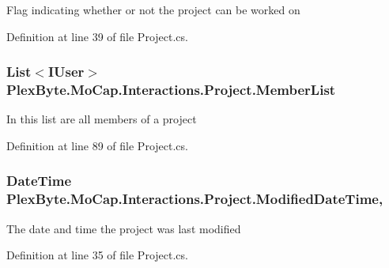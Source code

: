 Flag indicating whether or not the project can be worked on 



Definition at line 39 of file Project.\+cs.

\subsubsection[{\texorpdfstring{Member\+List}{MemberList}}]{\setlength{\rightskip}{0pt plus 5cm}List$<$I\+User$>$ Plex\+Byte.\+Mo\+Cap.\+Interactions.\+Project.\+Member\+List\hspace{0.3cm}{\ttfamily [get]}}\hypertarget{class_plex_byte_1_1_mo_cap_1_1_interactions_1_1_project_a2b3c3d78367b1ca4f4a4ae87e3b444ab}{}\label{class_plex_byte_1_1_mo_cap_1_1_interactions_1_1_project_a2b3c3d78367b1ca4f4a4ae87e3b444ab}


In this list are all members of a project 



Definition at line 89 of file Project.\+cs.

\subsubsection[{\texorpdfstring{Modified\+Date\+Time}{ModifiedDateTime}}]{\setlength{\rightskip}{0pt plus 5cm}Date\+Time Plex\+Byte.\+Mo\+Cap.\+Interactions.\+Project.\+Modified\+Date\+Time\hspace{0.3cm}{\ttfamily [get]}, {\ttfamily [set]}}\hypertarget{class_plex_byte_1_1_mo_cap_1_1_interactions_1_1_project_a5f3569713936103ba32da4338094a787}{}\label{class_plex_byte_1_1_mo_cap_1_1_interactions_1_1_project_a5f3569713936103ba32da4338094a787}


The date and time the project was last modified 



Definition at line 35 of file Project.\+cs.

